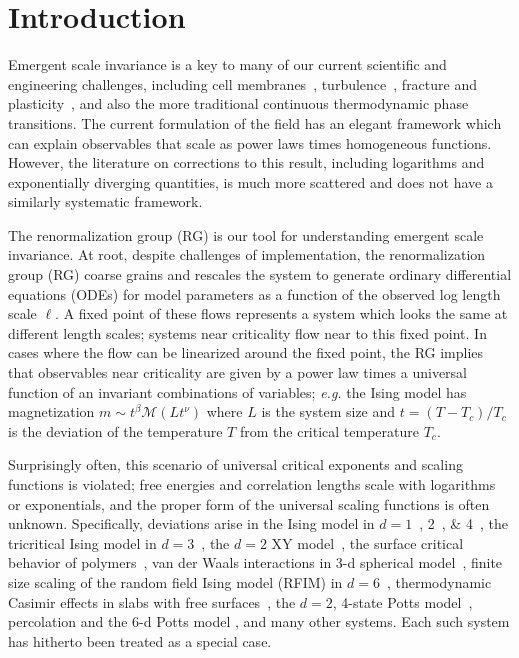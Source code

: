 \documentclass[
 reprint,
 amsmath,amssymb,
 aps, superscriptaddress, pre
]{revtex4-1}
\begin{document}
\section{Introduction}


Emergent scale invariance is a key to many of our current scientific and engineering challenges, including cell membranes~\cite{machta2012critical}, turbulence~\cite{canet2016fully}, fracture and plasticity~\cite{shekhawat2013damage, chen2013scaling}, and also the more traditional continuous thermodynamic phase transitions. 
The current formulation of the field has an elegant framework which can explain observables that scale as power laws times homogeneous functions. However, the literature on corrections to this result, including logarithms and exponentially diverging quantities, is much more scattered and does not have a similarly systematic framework. 

The renormalization group (RG) is our tool for understanding emergent
scale invariance. At root, despite challenges of implementation, the renormalization group (RG)
coarse grains and rescales the system to generate ordinary differential equations (ODEs) for model parameters as a
function of the observed log length scale $\ell$. A fixed point of these
flows represents a system which looks the same at different length scales;
systems near criticality flow near to this fixed point. In cases where the
flow can be linearized around the fixed point, the RG
implies that observables near criticality are given by a power law times
a universal function of an invariant combinations of variables; {\em e.g.}
the Ising model has magnetization $m \sim t^{\beta} \mathcal{M}(L t^\nu)$ where $L$ is the system size and $t = (T - T_c)/T_c$ is the deviation of the temperature $T$ from the critical temperature $T_c$.

Surprisingly often, this scenario of universal critical exponents
and scaling functions is violated; free energies and correlation lengths
scale with logarithms or exponentials, and the proper form of the 
universal scaling functions is often unknown. 
Specifically,
deviations arise in the Ising model in $d = 1$~\cite{ising1925beitrag}, 2~\cite{salas2002exact}, \& 4~\cite{larkin1995phase},
the tricritical Ising model in $d = 3$~\cite{Wegner73}, the $d=2$ XY
model~\cite{KosterlitzT73}, the surface critical behavior of
polymers~\cite{Diehl87, Eisenriegler88}, van der Waals interactions in 3-d spherical model~\cite{Dantchev06}, finite size scaling of the random field
Ising model (RFIM) in $d = 6$~\cite{Ahrens10}, thermodynamic Casimir effects in
slabs with free surfaces~\cite{Diehl12,Diehl14}, the $d = 2$,
4-state Potts model~\cite{Salas97,Shchur09,Berche13}, percolation and the 6-d Potts model \cite{PhysRevE.68.036129}, and many other systems. 
Each such system has hitherto been treated as a special case. 
\end{document}
